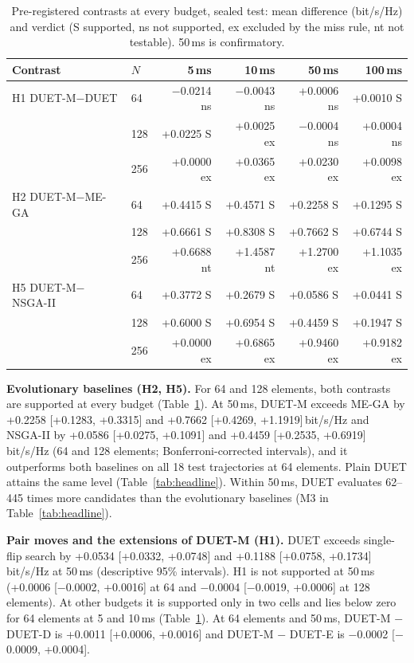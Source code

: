 \documentclass[runningheads]{llncs}
\newcommand{\duet}{\mbox{DUET}}\newcommand{\duetD}{\mbox{DUET-D}}\newcommand{\duetE}{\mbox{DUET-E}}
\newcommand{\bts}{\mbox{DUET-M}}
\begin{document}
\begin{table}[t]
\centering
\caption{Pre-registered contrasts at every budget, sealed test: mean difference (bit/s/Hz) and verdict (S supported, ns not supported, ex excluded by the miss rule, nt not testable). 50\,ms is confirmatory.}\label{tab:contrasts}
\scriptsize\setlength{\tabcolsep}{3pt}
\begin{tabular}{@{}ll|rrrr@{}}
\toprule
Contrast & $N$ & 5\,ms & 10\,ms & 50\,ms & 100\,ms\\
\midrule
H1 \bts{}$-$\duet{} & 64 & $-$0.0214 ns & $-$0.0043 ns & +0.0006 ns & +0.0010 S\\
 & 128 & +0.0225 S & +0.0025 ex & $-$0.0004 ns & +0.0004 ns\\
 & 256 & +0.0000 ex & +0.0365 ex & +0.0230 ex & +0.0098 ex\\
H2 \bts{}$-$ME-GA & 64 & +0.4415 S & +0.4571 S & +0.2258 S & +0.1295 S\\
 & 128 & +0.6661 S & +0.8308 S & +0.7662 S & +0.6744 S\\
 & 256 & +0.6688 nt & +1.4587 nt & +1.2700 ex & +1.1035 ex\\
H5 \bts{}$-$NSGA-II & 64 & +0.3772 S & +0.2679 S & +0.0586 S & +0.0441 S\\
 & 128 & +0.6000 S & +0.6954 S & +0.4459 S & +0.1947 S\\
 & 256 & +0.0000 ex & +0.6865 ex & +0.9460 ex & +0.9182 ex\\
\bottomrule
\end{tabular}
\end{table}

\textbf{Evolutionary baselines (H2, H5).} For 64 and 128 elements, both contrasts are supported at every budget (Table~\ref{tab:contrasts}). At 50\,ms, \bts{} exceeds ME-GA by +0.2258 [+0.1283, +0.3315] and +0.7662 [+0.4269, +1.1919]\,bit/s/Hz and NSGA-II by +0.0586 [+0.0275, +0.1091] and +0.4459 [+0.2535, +0.6919]\,bit/s/Hz (64 and 128 elements; Bonferroni-corrected intervals), and it outperforms both baselines on all 18 test trajectories at 64 elements. Plain \duet{} attains the same level (Table~\ref{tab:headline}). Within 50\,ms, \duet{} evaluates 62--445 times more candidates than the evolutionary baselines (M3 in Table~\ref{tab:headline}).

\textbf{Pair moves and the extensions of \bts{} (H1).} \duet{} exceeds single-flip search by +0.0534 [+0.0332, +0.0748] and +0.1188 [+0.0758, +0.1734]\,bit/s/Hz at 50\,ms (descriptive 95\% intervals). H1 is not supported at 50\,ms (+0.0006 [$-$0.0002, +0.0016] at 64 and $-$0.0004 [$-$0.0019, +0.0006] at 128 elements). At other budgets it is supported only in two cells and lies below zero for 64 elements at 5 and 10\,ms (Table~\ref{tab:contrasts}). At 64 elements and 50\,ms, \bts{} $-$ \duetD{} is +0.0011 [+0.0006, +0.0016] and \bts{} $-$ \duetE{} is $-$0.0002 [$-$0.0009, +0.0004].
\end{document}
